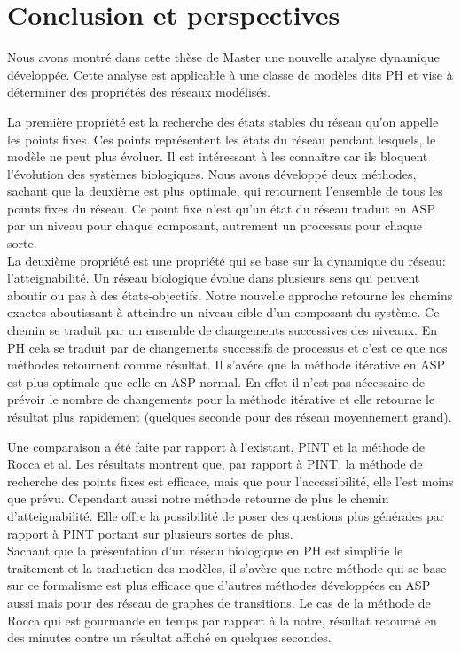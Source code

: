 \section{Conclusion et perspectives}

Nous avons montré dans cette thèse de Master une nouvelle analyse dynamique développée. Cette analyse est applicable à une classe de modèles dits PH et vise à déterminer des propriétés des réseaux modélisés. 

La première propriété est la recherche des états stables du réseau qu'on appelle les points fixes. Ces points représentent les états du réseau pendant lesquels, le modèle ne peut plus évoluer. Il est intéressant à les connaitre car ils bloquent l'évolution des systèmes biologiques. Nous avons développé deux méthodes, sachant que la deuxième est plus optimale, qui retournent l'ensemble de tous les points fixes du réseau. Ce point fixe n'est qu'un état du réseau traduit en ASP par un niveau pour chaque composant, autrement un processus pour chaque sorte. \\
La deuxième propriété est une propriété qui se base sur la dynamique du réseau: l'atteignabilité. Un réseau biologique évolue dans plusieurs sens qui peuvent aboutir ou pas à des états-objectifs. Notre nouvelle approche retourne les chemins exactes aboutissant à atteindre un niveau cible d'un composant du système. Ce chemin se traduit par un ensemble de changements successives des niveaux. En PH cela se traduit par de changements successifs de processus et c'est ce que nos méthodes retournent comme résultat. Il s'avére que la méthode itérative en ASP est plus optimale que celle en ASP normal. En effet il n'est pas nécessaire de prévoir le nombre de changements pour la méthode itérative et elle retourne le résultat plus rapidement (quelques seconde pour des réseau moyennement grand).

Une comparaison a été faite par rapport à l'existant, \textsc{PINT} et la méthode de Rocca et al. Les résultats montrent que, par rapport à \textsc{PINT}, la méthode de recherche des points fixes est efficace, mais que pour l'accessibilité, elle l'est moins que prévu. Cependant aussi notre méthode retourne de plus le chemin d'atteignabilité. Elle offre la possibilité de poser des questions plus générales par rapport à \textsc{PINT} portant sur plusieurs sortes de plus. \\
Sachant que la présentation d'un réseau biologique en PH est simplifie le traitement et la traduction des modèles, il s'avère que notre méthode qui se base sur ce formalisme est plus efficace que d'autres méthodes développées en ASP aussi mais pour des réseau de graphes de transitions. Le cas de la méthode de Rocca qui est gourmande en temps par rapport à la notre, résultat retourné en des minutes contre un résultat affiché en quelques secondes.\\

